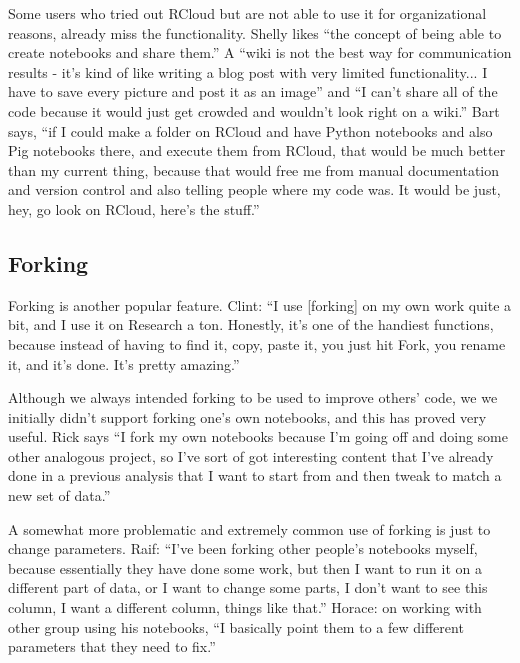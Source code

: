Some users who tried out RCloud but are not able to use it for organizational
reasons, already miss the functionality. Shelly likes
``the concept of being able to create notebooks and share them.'' A ``wiki is not the
best way for communication results - it's kind of like writing a blog post with
very limited functionality... I have to save every
picture and post it as an image'' and ``I can't share all of the code because it
would just get crowded and wouldn't look right on a wiki.'' Bart says, ``if I could
make a folder on
RCloud and have Python notebooks and also Pig notebooks there, and execute them
from RCloud, that would be much better than my current thing, because that would
free me from manual documentation and version control and also telling people
where my code was. It would be just, hey, go look on RCloud, here's the stuff.''



\subsection{Forking}
Forking is another popular feature. 
Clint: ``I use [forking] on my own work quite a bit, and I use it on Research a
ton. Honestly, it's one of the handiest functions, because instead of
having to find it, copy, paste it, you just hit Fork, you rename it, and it's
done. It's pretty amazing.''

Although we always intended forking to be used to improve others' code, we
we initially didn't support forking one's own notebooks, and this has proved very useful. Rick says ``I fork my own notebooks because I'm going off and doing some other
analogous project, so I've sort of got interesting content that I've already
done in a previous analysis that I want to start from and then tweak to match a
new set of data.''

A somewhat more problematic and extremely common use of forking is just to change parameters. Raif: ``I've been forking other people's notebooks myself, because essentially
they have done some work, but then I want to run it on a different part of data,
or I want to change some parts, I don't want to see this column, I want a
different column, things like that.'' Horace: on working with other group using his notebooks, ``I basically point them to a few different parameters that they need to fix.''

